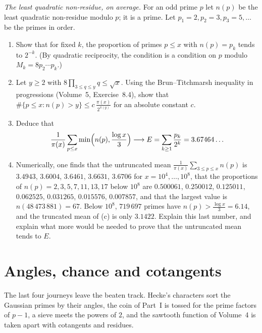 \begin{exercise}[Journey]\label{pb:erdosnp}
\emph{The least quadratic non-residue, on average.} For an odd prime $p$ let $n(p)$ be the least quadratic non-residue modulo $p$; it is a prime. Let
$p_1=2,p_2=3,p_3=5,\dots$ be the primes in order.
\begin{enumerate}[label=(\alph*)]
\item Show that for fixed $k$, the proportion of primes $p\le x$ with $n(p)=p_k$ tends to $2^{-k}$. (By quadratic reciprocity, the condition is a condition on $p$ modulo
$M_k=8p_2\cdots p_k$.)
\item Let $y\ge2$ with $8\prod_{3\le q\le y}q\le\sqrt x$. Using the Brun--Titchmarsh inequality in progressions (Volume~5, Exercise~8.4), show that
$\#\{p\le x:n(p)>y\}\le c\,\frac{\pi(x)}{2^{\pi(y)}}$ for an absolute constant $c$.
\item Deduce that
\[
\frac1{\pi(x)}\sum_{p\le x}\min\Bigl(n(p),\frac{\log x}3\Bigr)\longrightarrow E=\sum_{k\ge1}\frac{p_k}{2^k}=3.67464\ldots
\]
\item Numerically, one finds that the untruncated mean $\frac1{\pi(x)}\sum_{3\le p\le x}n(p)$ is $3.4943$, $3.6004$, $3.6461$, $3.6631$, $3.6706$ for $x=10^4,\dots,10^8$, that
the proportions of $n(p)=2,3,5,7,11,13,17$ below $10^8$ are $0.500061$, $0.250012$, $0.125011$, $0.062525$, $0.031265$, $0.015576$, $0.007857$, and that the largest value is
$n(48\,473\,881)=67$. Below $10^8$, $719\,697$ primes have $n(p)>\frac{\log x}3=6.14$, and the truncated mean of (c) is only $3.1422$. Explain this last number, and
explain what more would be needed to prove that the untruncated mean tends to $E$.
\end{enumerate}
\end{exercise}

\section{Angles, chance and cotangents}

The last four journeys leave the beaten track. Hecke's characters sort the Gaussian primes by their angles, the coin of Part~I is tossed for the prime factors of
$p-1$, a sieve meets the powers of $2$, and the sawtooth function of Volume~4 is taken apart with cotangents and residues.

